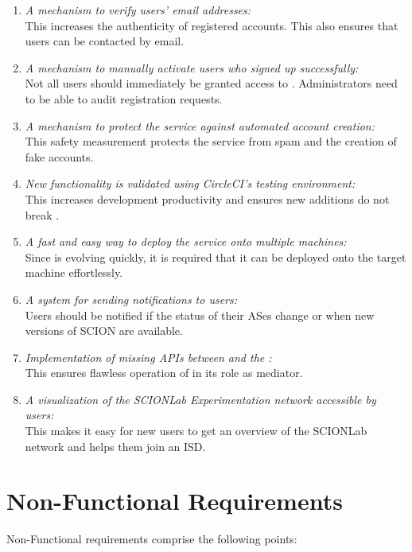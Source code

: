 \begin{enumerate}  
	\item \textit{A mechanism to verify users' email addresses:}\\
		This increases the authenticity of registered accounts. This also ensures that users can be contacted by email.
	\item \textit{A mechanism to manually activate users who signed up successfully:}\\
		Not all users should immediately be granted access to \lcs. Administrators need to be able to audit registration requests.
	\item \textit{A mechanism to protect the service against automated account creation:}\\
		This safety measurement protects the service from spam and the creation of fake accounts.
	\item \textit{New functionality is validated using CircleCI's testing environment:}\\
		This increases development productivity and ensures new additions do not break \lcs.
	\item \textit{A fast and easy way to deploy the service onto multiple machines:}\\
		Since \lcs is evolving quickly, it is required that it can be deployed onto the target machine effortlessly.
	\item \textit{A system for sending notifications to users:}\\
		Users should be notified if the status of their ASes change or when new versions of SCION are available.
	\item \textit{Implementation of missing APIs between \cords and the \lmi:}\\
		This ensures flawless operation of \lcs in its role as mediator.
	\item \textit{A visualization of the SCIONLab Experimentation network accessible by users:}\\
		This makes it easy for new users to get an overview of the SCIONLab network and helps them join an ISD.
\end{enumerate}

\section{Non-Functional Requirements}
\label{non-func_req}

Non-Functional requirements comprise the following points:

